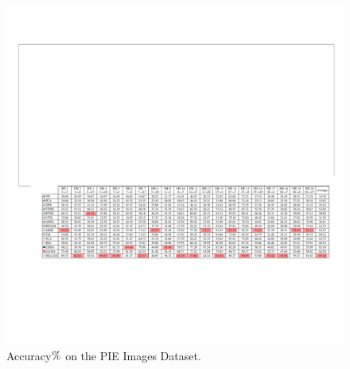 \documentclass[journal,twocolumn]{IEEEtran}
\begin{document}
\begin{CJK*}{UTF8}{gkai}
    
	\begin{figure}[h!]
		\centering
		\includegraphics[width=1\linewidth]{PIE.pdf}
		\caption { Accuracy${\rm{\% }}$ on the PIE Images Dataset.} 
		\label{fig:accPIE}
	\end{figure} 	

	





\end{CJK*}
\end{document}

